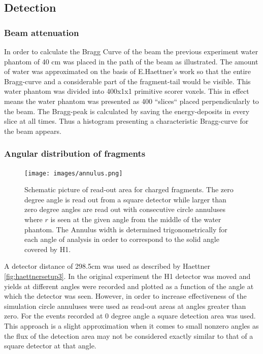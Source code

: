 \subsection{Detection}

\subsubsection{Beam attenuation}

In order to calculate the Bragg Curve of the beam the previous experiment water phantom of 40 cm was placed in the path of the beam as illustrated. The amount of water was approximated on the basis of E.Haettner's work so that the entire Bragg-curve and a considerable part of the fragment-tail would be visible. This water phantom was divided into 400x1x1 primitive scorer voxels. This in effect means the water phantom was presented as 400 ``slices`` placed perpendicularly to the beam. The Bragg-peak is calculated by saving the energy-deposits in every slice at all times. Thus a histogram presenting a characteristic Bragg-curve for the beam appears.

\subsubsection{Angular distribution of fragments\label{AngularDistributionText}}

\begin{figure}[!h] 
\begin{center}
\texttt{[image: images/annulus.png]}  
\caption{\label{fig:annulusesExplained} Schematic picture of read-out area for charged fragments. The zero degree angle is read out from a square detector while larger than zero degree angles are read out with consecutive circle annuluses where $r$ is seen at the given angle from the middle of the water phantom. The Annulus width is determined trigonometrically for each angle of analysis in order to correspond to the solid angle covered by H1.}
\end{center}
\end{figure}

A detector distance of 298.5cm was used as described by Haettner \ref{fig:haettnersetup3}. In the original experiment the H1 detector was moved and yields at different angles were recorded and plotted as a function of the angle at which the detector was seen. However, in order to increase effectiveness of the simulation circle annuluses were used as read-out areas at angles greater than zero. For the events recorded at 0 degree angle a square detection area was used. This approach is a slight approximation when it comes to small nonzero angles as the flux of the detection area may not be considered exactly similar to that of a square detector at that angle.

